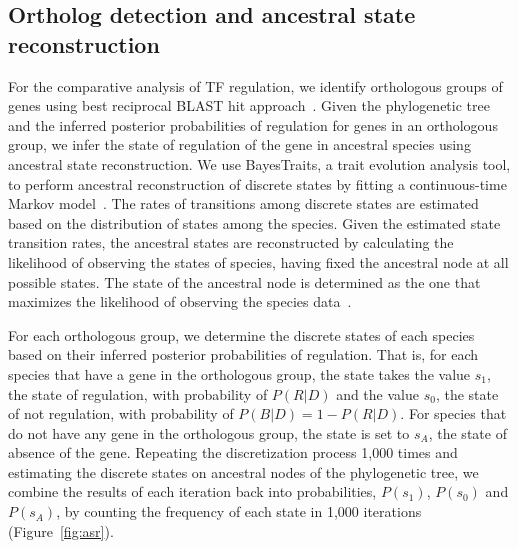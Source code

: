\documentclass[12pt]{article}
\begin{document}
\subsection{Ortholog detection and ancestral state reconstruction}

For the comparative analysis of TF regulation, we identify orthologous groups
of genes using best reciprocal BLAST hit
approach~\cite{wall2003detecting}. Given the phylogenetic tree and the inferred
posterior probabilities of regulation for genes in an orthologous group, we
infer the state of regulation of the gene in ancestral species using ancestral
state reconstruction. We use BayesTraits, a trait evolution analysis tool, to
perform ancestral reconstruction of discrete states by fitting a
continuous-time Markov model~\cite{pagel2004bayesian}. The rates of transitions
among discrete states are estimated based on the distribution of states among
the species. Given the estimated state transition rates, the ancestral states
are reconstructed by calculating the likelihood of observing the states of
species, having fixed the ancestral node at all possible states. The state of
the ancestral node is determined as the one that maximizes the likelihood of
observing the species data~\cite{pagel1997inferring, pagel1999maximum}.

For each orthologous group, we determine the discrete states of each species
based on their inferred posterior probabilities of regulation. That is, for
each species that have a gene in the orthologous group, the state takes the
value $s_1$, the state of regulation, with probability of $P(R|D)$ and the
value $s_0$, the state of not regulation, with probability of
$P(B|D)=1-P(R|D)$. For species that do not have any gene in the orthologous
group, the state is set to $s_A$, the state of absence of the gene. Repeating
the discretization process 1,000 times and estimating the discrete states on
ancestral nodes of the phylogenetic tree, we combine the results of each
iteration back into probabilities, $P(s_1)$, $P(s_0)$ and $P(s_A)$, by counting
the frequency of each state in 1,000 iterations (Figure~\ref{fig:asr}).
\end{document}
